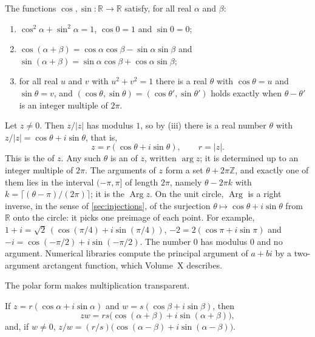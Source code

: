 \begin{assumption}
\label{asm:trig}
The functions $\cos,\sin\colon\mathbb R\to\mathbb R$ satisfy, for all real $\alpha$ and $\beta$:
\begin{enumerate}
\item $\cos^2\alpha+\sin^2\alpha=1$, $\cos0=1$ and $\sin0=0$;
\item $\cos(\alpha+\beta)=\cos\alpha\cos\beta-\sin\alpha\sin\beta$ and $\sin(\alpha+\beta)=\sin\alpha\cos\beta+\cos\alpha\sin\beta$;
\item for all real $u$ and $v$ with $u^2+v^2=1$ there is a real $\theta$ with $\cos\theta=u$ and $\sin\theta=v$, and $(\cos\theta,\sin\theta)=(\cos\theta',\sin\theta')$ holds exactly when $\theta-\theta'$ is an integer multiple of $2\pi$.
\end{enumerate}
\end{assumption}

Let $z\ne0$. Then $z/|z|$ has modulus $1$, so by (iii) there is a real number $\theta$ with $z/|z|=\cos\theta+i\sin\theta$, that is,
\begin{equation}
z=r(\cos\theta+i\sin\theta),\qquad r=|z| .
\label{eq:polar}
\end{equation}
This is the  of $z$. Any such $\theta$ is an  of $z$, written $\arg z$; it is determined up to an integer multiple of $2\pi$. The arguments of $z$ form a set $\theta+2\pi\mathbb Z$, and exactly one of them lies in the interval $(-\pi,\pi]$ of length $2\pi$, namely $\theta-2\pi k$ with $k=\lceil(\theta-\pi)/(2\pi)\rceil$; it is the  $\operatorname{Arg}z$. On the unit circle, $\operatorname{Arg}$ is a right inverse, in the sense of \cref{sec:injections}, of the surjection $\theta\mapsto\cos\theta+i\sin\theta$ from $\mathbb R$ onto the circle: it picks one preimage of each point. For example, $1+i=\sqrt2\,(\cos(\pi/4)+i\sin(\pi/4))$, $-2=2(\cos\pi+i\sin\pi)$ and $-i=\cos(-\pi/2)+i\sin(-\pi/2)$. The number $0$ has modulus $0$ and no argument. Numerical libraries compute the principal argument of $a+bi$ by a two-argument arctangent function, which Volume~X describes.

The polar form makes multiplication transparent.

\begin{proposition}
\label{prop:polar-mult}
If $z=r(\cos\alpha+i\sin\alpha)$ and $w=s(\cos\beta+i\sin\beta)$, then
\[
zw=rs\bigl(\cos(\alpha+\beta)+i\sin(\alpha+\beta)\bigr),
\]
and, if $w\ne0$, $z/w=(r/s)\bigl(\cos(\alpha-\beta)+i\sin(\alpha-\beta)\bigr)$.
\end{proposition}

